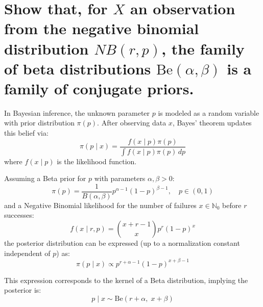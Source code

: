\newpage


\section{Show that, for $X$ an observation from the negative binomial distribution $NB(r, p)$, the family of beta distributions $\text{Be}(\alpha, \beta)$ is a family of conjugate priors.} %

In Bayesian inference, the unknown parameter \(p\) is modeled as a random variable with prior distribution \(\pi(p)\). After observing data \(x\), Bayes’ theorem updates this belief via:
\begin{equation}
\pi(p \mid x) = \frac{f(x \mid p) \pi(p)}{\int f(x \mid p) \pi(p) \, dp}
\end{equation}
where \(f(x \mid p)\) is the likelihood function.

Assuming a Beta prior for \(p\) with parameters \(\alpha, \beta > 0\):
\begin{equation}
\pi(p) = \frac{1}{B(\alpha, \beta)} p^{\alpha - 1} (1 - p)^{\beta - 1}, \quad p \in (0,1)
\end{equation}
and a Negative Binomial likelihood for the number of failures \(x \in \mathbb{N}_0\) before \(r\) successes:
\begin{equation}
f(x \mid r, p) = \binom{x + r - 1}{x} p^{r} (1 - p)^{x}
\end{equation}
the posterior distribution can be expressed (up to a normalization constant independent of \(p\)) as:
\begin{equation}
\pi(p \mid x) \propto p^{r + \alpha - 1} (1 - p)^{x + \beta - 1}
\end{equation}

This expression corresponds to the kernel of a Beta distribution, implying the posterior is:
\begin{equation}
p \mid x \sim \text{Be}(r + \alpha, \; x + \beta)
\end{equation}

